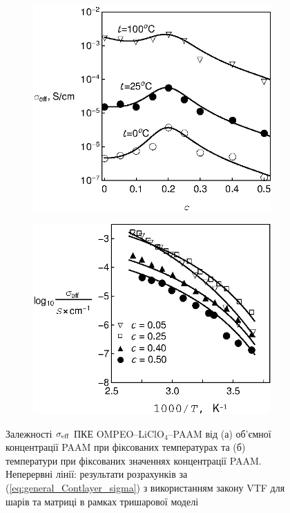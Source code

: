 \documentclass[twoside,a4paper,14pt]{vakaref-utf8}
\begin{document}
\begin{figure}[tb]
	\centering
	\begin{subfigure}[t]{0.45\textwidth}
		\includegraphics[width=\textwidth]{Fig6_Isochores2.eps}
		\caption{} 
		\label{fig:OMPEO-LiClO4-Temp-a}
	\end{subfigure}%
	\quad
	\begin{subfigure}[t]{0.47\textwidth}
		\includegraphics[width=\textwidth]{Fig8_TemperatureDependence_4.eps}
		\caption{} \label{fig:OMPEO-LiClO4-TempDependence}
	\end{subfigure}%
	\caption{\label{fig:OMPEO-LiClO4-Temp} Залежності $\sigma_{\rm eff}$ ПКЕ OMPEO--LiClO$_4$--PAAM \cite{Wiec1994} від (а) об'ємної концентрації PAAM при фіксованих температурах та (б) температури при фіксованих значеннях концентрації PAAM.
		Неперервні лінії: результати розрахунків за (\ref{eq:general_Contlayer_sigma}) з використанням закону VTF для шарів та матриці
		в рамках тришарової моделі}
	\vspace{-10pt}
\end{figure}
\end{document}
